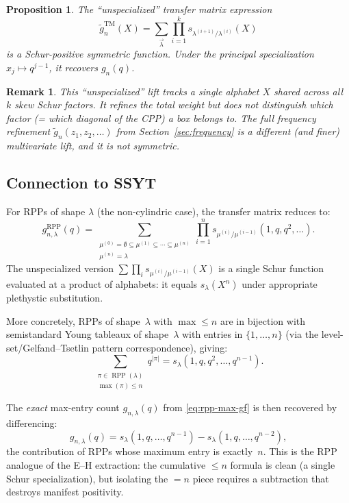 \documentclass[11pt]{article}
\newtheorem{proposition}[theorem]{Proposition}
\newtheorem{remark}[theorem]{Remark}
\newcommand{\RPP}{\operatorname{RPP}}
\begin{document}
\begin{proposition}\label{prop:schur-pos}
The ``unspecialized'' transfer matrix expression
\[
  \widetilde{g}_n^{\mathrm{TM}}(X)
  = \sum_{\vec{\lambda}}
  \prod_{i=1}^{k}
  s_{\lambda^{(i+1)}/\lambda^{(i)}}(X)
\]
is a Schur-positive symmetric function.
Under the principal specialization $x_j \mapsto q^{j-1}$,
it recovers $g_n(q)$.
\end{proposition}

\begin{remark}
This ``unspecialized'' lift tracks a \emph{single} alphabet
$X$ shared across all $k$ skew Schur factors. It refines
the total weight but does \emph{not} distinguish which
factor (= which diagonal of the CPP) a box belongs to.
The full frequency refinement
$\tilde{g}_n(z_1, z_2, \ldots)$ from
Section~\ref{sec:frequency} is a different (and finer)
multivariate lift, and it is \emph{not} symmetric.
\end{remark}

\subsection{Connection to SSYT}

For RPPs of shape $\lambda$ (the non-cylindric case),
the transfer matrix reduces to:
\[
  g_{n,\lambda}^{\mathrm{RPP}}(q)
  = \sum_{\substack{\mu^{(0)} = \emptyset \subseteq
    \mu^{(1)} \subseteq \cdots \subseteq \mu^{(n)} \\
    \mu^{(n)} = \lambda}}
  \prod_{i=1}^{n} s_{\mu^{(i)}/\mu^{(i-1)}}(1, q, q^2, \ldots).
\]
The unspecialized version $\sum \prod_i s_{\mu^{(i)}/\mu^{(i-1)}}(X)$
is a single Schur function evaluated at a product of
alphabets: it equals $s_\lambda(X^n)$ under appropriate
plethystic substitution.

More concretely, RPPs of shape~$\lambda$ with
$\max \leq n$ are in bijection with semistandard Young
tableaux of shape~$\lambda$ with entries in $\{1, \ldots, n\}$
(via the level-set/Gelfand--Tsetlin pattern correspondence),
giving:
\begin{equation}\label{eq:rpp-schur}
  \sum_{\substack{\pi \in \RPP(\lambda) \\
  \max(\pi) \leq n}} q^{|\pi|}
  = s_\lambda(1, q, q^2, \ldots, q^{n-1}).
\end{equation}

The \emph{exact} max-entry count $g_{n,\lambda}(q)$ from
\eqref{eq:rpp-max-gf} is then recovered by differencing:
\begin{equation}\label{eq:rpp-exact-max}
  g_{n,\lambda}(q)
  = s_\lambda(1, q, \ldots, q^{n-1})
  - s_\lambda(1, q, \ldots, q^{n-2}),
\end{equation}
the contribution of RPPs whose maximum entry is exactly~$n$.
This is the RPP analogue of the E--H extraction: the
cumulative $\leq n$ formula is clean (a single Schur
specialization), but isolating the $= n$ piece requires
a subtraction that destroys manifest positivity.
\end{document}
